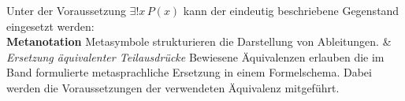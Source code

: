 \begin{BandUebersicht}
Unter der Voraussetzung \(\exists!x\,P(x)\) kann der eindeutig
beschriebene Gegenstand eingesetzt werden:
\\
\addlinespace[.8ex]
\textbf{Metanotation}
Metasymbole strukturieren die Darstellung von Ableitungen.
&
\textit{Ersetzung äquivalenter Teilausdrücke}
Bewiesene Äquivalenzen erlauben die im Band formulierte
metasprachliche Ersetzung in einem Formelschema. Dabei werden
die Voraussetzungen der verwendeten Äquivalenz mitgeführt.
\\
\end{BandUebersicht}
